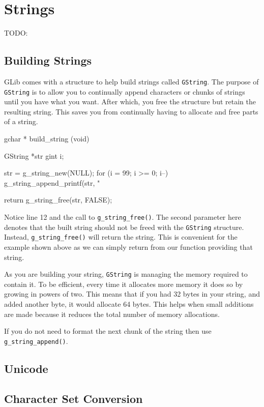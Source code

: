 \chapter{Strings}

TODO: 

\section{Building Strings}

GLib comes with a structure to help build strings called \verb|GString|.
The purpose of \verb|GString| is to allow you to continually append characters or chunks of strings until you have what you want.
After which, you free the structure but retain the resulting string.
This saves you from continually having to allocate and free parts of a string.

\begin{code}{}
gchar *
build_string (void)
{
  GString *str
  gint i;

  str = g_string_new(NULL);
  for (i = 99; i >= 0; i--) {
    g_string_append_printf(str, "%
  }

  return g_string_free(str, FALSE);
}
\end{code}

Notice line 12 and the call to \verb|g_string_free()|.
The second parameter here denotes that the built string should not be freed with the \verb|GString| structure.
Instead, \verb|g_string_free()| will return the string.
This is convenient for the example shown above as we can simply return from our function providing that string.

As you are building your string, \verb|GString| is managing the memory required to contain it.
To be efficient, every time it allocates more memory it does so by growing in powers of two.
This means that if you had 32 bytes in your string, and added another byte, it would allocate 64 bytes.
This helps when small additions are made because it reduces the total number of memory allocations.

If you do not need to format the next chunk of the string then use \verb|g_string_append()|.

\section{Unicode}

\section{Character Set Conversion}

